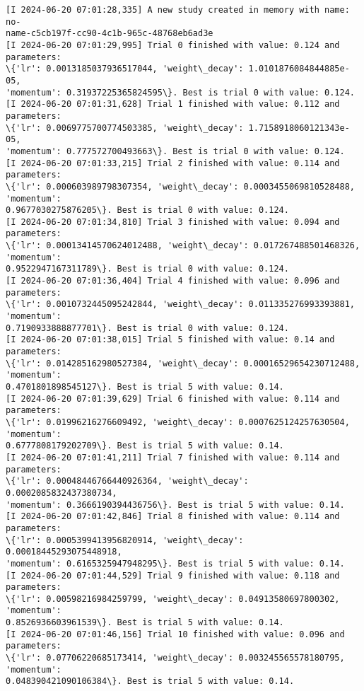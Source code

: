 \documentclass[11pt]{article}
\begin{document}
    \begin{Verbatim}[commandchars=\\\{\}]
[I 2024-06-20 07:01:28,335] A new study created in memory with name: no-
name-c5cb197f-cc90-4c1b-965c-48768eb6ad3e
[I 2024-06-20 07:01:29,995] Trial 0 finished with value: 0.124 and parameters:
\{'lr': 0.0013185037936517044, 'weight\_decay': 1.0101876084844885e-05,
'momentum': 0.31937225365824595\}. Best is trial 0 with value: 0.124.
[I 2024-06-20 07:01:31,628] Trial 1 finished with value: 0.112 and parameters:
\{'lr': 0.0069775700774503385, 'weight\_decay': 1.7158918060121343e-05,
'momentum': 0.777572700493663\}. Best is trial 0 with value: 0.124.
[I 2024-06-20 07:01:33,215] Trial 2 finished with value: 0.114 and parameters:
\{'lr': 0.000603989798307354, 'weight\_decay': 0.0003455069810528488, 'momentum':
0.9677030275876205\}. Best is trial 0 with value: 0.124.
[I 2024-06-20 07:01:34,810] Trial 3 finished with value: 0.094 and parameters:
\{'lr': 0.00013414570624012488, 'weight\_decay': 0.017267488501468326, 'momentum':
0.9522947167311789\}. Best is trial 0 with value: 0.124.
[I 2024-06-20 07:01:36,404] Trial 4 finished with value: 0.096 and parameters:
\{'lr': 0.0010732445095242844, 'weight\_decay': 0.011335276993393881, 'momentum':
0.7190933888877701\}. Best is trial 0 with value: 0.124.
[I 2024-06-20 07:01:38,015] Trial 5 finished with value: 0.14 and parameters:
\{'lr': 0.014285162980527384, 'weight\_decay': 0.00016529654230712488, 'momentum':
0.4701801898545127\}. Best is trial 5 with value: 0.14.
[I 2024-06-20 07:01:39,629] Trial 6 finished with value: 0.114 and parameters:
\{'lr': 0.01996216276609492, 'weight\_decay': 0.0007625124257630504, 'momentum':
0.6777808179202709\}. Best is trial 5 with value: 0.14.
[I 2024-06-20 07:01:41,211] Trial 7 finished with value: 0.114 and parameters:
\{'lr': 0.00048446766440926364, 'weight\_decay': 0.0002085832437380734,
'momentum': 0.3666190394436756\}. Best is trial 5 with value: 0.14.
[I 2024-06-20 07:01:42,846] Trial 8 finished with value: 0.114 and parameters:
\{'lr': 0.0005399413956820914, 'weight\_decay': 0.00018445293075448918,
'momentum': 0.6165325947948295\}. Best is trial 5 with value: 0.14.
[I 2024-06-20 07:01:44,529] Trial 9 finished with value: 0.118 and parameters:
\{'lr': 0.00598216984259799, 'weight\_decay': 0.04913580697800302, 'momentum':
0.8526936603961539\}. Best is trial 5 with value: 0.14.
[I 2024-06-20 07:01:46,156] Trial 10 finished with value: 0.096 and parameters:
\{'lr': 0.07706220685173414, 'weight\_decay': 0.003245565578180795, 'momentum':
0.048390421090106384\}. Best is trial 5 with value: 0.14.

\end{Verbatim}
\end{document}
